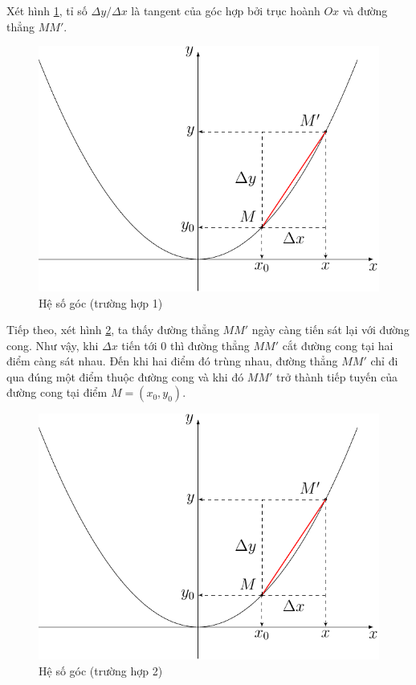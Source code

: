Xét hình \ref{int2a}, tỉ số $\Delta y / \Delta x$ là tangent của góc hợp bởi trục hoành $Ox$ và đường thẳng $MM'$.

\begin{figure}[ht]
	\centering
	\includegraphics[page=1,scale=0.75]{analytic_geometry/tangent.pdf}
	\caption{Hệ số góc (trường hợp 1)}
	\label{int2a}
\end{figure}

Tiếp theo, xét hình \ref{int2b}, ta thấy đường thẳng $MM'$ ngày càng tiến sát lại với đường cong. Như vậy, khi $\Delta x$ tiến tới 0 thì đường thẳng $MM'$ cắt đường cong tại hai điểm càng sát nhau. Đến khi hai điểm đó trùng nhau, đường thẳng $MM'$ chỉ đi qua đúng một điểm thuộc đường cong và khi đó $MM'$ trở thành tiếp tuyến của đường cong tại điểm $M = (x_0, y_0)$.

\begin{figure}[ht]
	\centering
	\includegraphics[page=2,scale=0.75]{analytic_geometry/tangent.pdf}
	\caption{Hệ số góc (trường hợp 2)}
	\label{int2b}
\end{figure}

